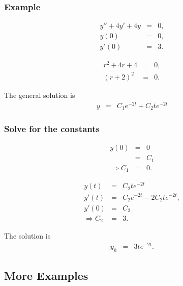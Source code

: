 \begin{frame}
  \frametitle{Example}

  \begin{eqnarray*}
    y'' + 4y' + 4y & = & 0, \\
    y(0) & = & 0, \\
    y'(0) & = & 3.
  \end{eqnarray*}

  {
    \begin{eqnarray*}
      r^2 + 4r + 4 & = & 0, \\
      (r+2)^2 & = & 0.
    \end{eqnarray*}

    The general solution is
    \begin{eqnarray*}
      y & = & C_1 e^{-2t} + C_2 t e^{-2t}
    \end{eqnarray*}

  }

\end{frame}



\begin{frame}
  \frametitle{Solve for the constants}

  \begin{eqnarray*}
    y(0) & = & 0 \\
    & = & C_1 \\
    \Rightarrow C_1 & = & 0.
  \end{eqnarray*}

  \begin{eqnarray*}
    y(t) & = & C_2 t e^{-2t} \\
    y'(t) & = & C_2 e^{-2t} - 2 C_2 t e^{-2t}, \\
    y'(0) & = & C_2 \\
    \Rightarrow C_2 & = & 3.
  \end{eqnarray*}

  The solution is
  \begin{eqnarray*}
    y_h & = & 3 t e^{-2t}.
  \end{eqnarray*}

\end{frame}

\subsection{More Examples}

